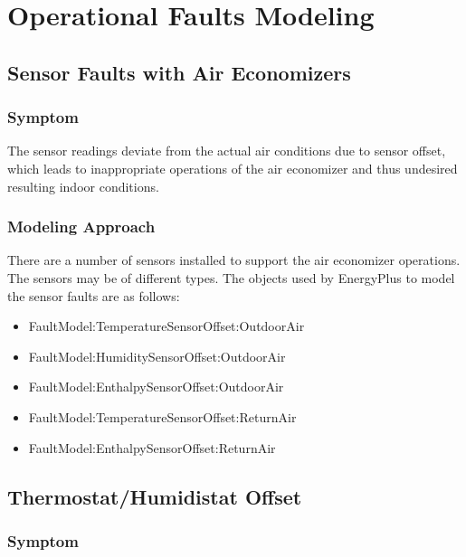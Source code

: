 \section{Operational Faults Modeling}\label{operational-faults-modeling}

\subsection{Sensor Faults with Air Economizers}\label{sensor-faults-with-air-economizers}

\subsubsection{Symptom}\label{symptom}

The sensor readings deviate from the actual air conditions due to sensor offset, which leads to inappropriate operations of the air economizer and thus undesired resulting indoor conditions.

\subsubsection{Modeling Approach}\label{modeling-approach}

There are a number of sensors installed to support the air economizer operations. The sensors may be of different types. The objects used by EnergyPlus to model the sensor faults are as follows:

\begin{itemize}
\tightlist
\item
  FaultModel:TemperatureSensorOffset:OutdoorAir
\item
  FaultModel:HumiditySensorOffset:OutdoorAir
\item
  FaultModel:EnthalpySensorOffset:OutdoorAir
\item
  FaultModel:TemperatureSensorOffset:ReturnAir
\item
  FaultModel:EnthalpySensorOffset:ReturnAir
\end{itemize}

\subsection{Thermostat/Humidistat Offset}\label{thermostathumidistat-offset}

\subsubsection{Symptom}\label{symptom-1}


